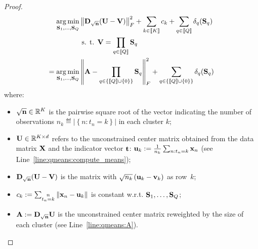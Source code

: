 \begin{proof}
\small
\begin{align}
 \operatorname*{arg\,min}_{{\mathbf{S}}_1, \ldots,{\mathbf{S}}_Q} & \left \| {\mathbf{D}}_{\sqrt{{\mathbf{n}}}} ({\mathbf{U}} - {\mathbf{V}})\right \|_F^2 + \sum_{k\in\left \llbracket K\right \rrbracket} c_k + \sum_{q\in\left \llbracket Q\right \rrbracket} \delta_q({\mathbf{S}}_q) \notag \\
 & \text{ s. t. } {\mathbf{V}} = \prod_{q\in\left \llbracket Q\right \rrbracket}{{\mathbf{S}}_q} \nonumber\\
 = \operatorname*{arg\,min}_{{\mathbf{S}}_1, \ldots,{\mathbf{S}}_Q} & \left \| {\mathbf{A}} - \prod_{q\in\left\{\left \llbracket Q\right \rrbracket \cup \{0\}\right\}}{{\mathbf{S}}_q}\right \|_F^2 + \sum_{q\in\left\{\left \llbracket Q\right \rrbracket \cup \{0\}\right\}} \delta_q({\mathbf{S}}_q) \notag \\
 \label{eq:qmeans_problem_t_fixed}
 \end{align}
 \normalsize
%
where:
%
\begin{itemize}
 \item $\sqrt{{\mathbf{n}}} \in \mathbb{R}^{K}$ is the pairwise square root of the vector indicating the number of observations $n_k \eqdef \left | \left \lbrace n: t_n = k\right \rbrace \right |$  in each cluster $k$;
 \item ${\mathbf{U}}\in \mathbb{R}^{K \times d}$ refers to the unconstrained center matrix obtained from the data matrix ${\mathbf{X}}$ and the indicator vector ${\mathbf{t}}$: ${\mathbf{u}}_k := \frac{1}{n_k}\sum_{n:t_n = k} {{\mathbf{x}}_n}$ (see Line~\ref{line:qmeans:compute_means});
 \item ${\mathbf{D}}_{\sqrt{{\mathbf{n}}}} ({\mathbf{U}} - {\mathbf{V}})$ is the matrix with $\sqrt{n_k}\left ({\mathbf{u}}_k-{\mathbf{v}}_k\right )$ as row~$k$;
 \item $c_k := \sum_{\substack{n\\t_n = k}}\left \| {\mathbf{x}}_n - {\mathbf{u}}_k\right \|$ is constant w.r.t. $ {\mathbf{S}}_1, \ldots,{\mathbf{S}}_Q$;
 \item ${\mathbf{A}} := {\mathbf{D}}_{\sqrt{{\mathbf{n}}}} {\mathbf{U}}$ is the unconstrained center matrix reweighted by the size of each cluster (see Line~\ref{line:qmeans:A}).
\end{itemize}


\end{proof}
